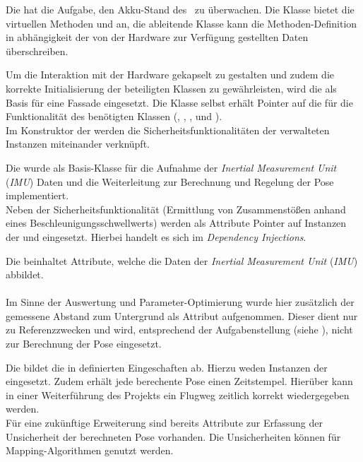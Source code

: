 
Die  hat die Aufgabe, den Akku-Stand des \Quad\ zu überwachen. Die Klasse bietet die virtuellen Methoden  und  an, die ableitende Klasse kann die Methoden-Definition in abhängigkeit der von der Hardware zur Verfügung gestellten Daten überschreiben.


Um die Interaktion mit der Hardware gekapselt zu gestalten und zudem die korrekte Initialisierung der beteiligten Klassen zu gewährleisten, wird die  als Basis für eine Fassade eingesetzt. Die Klasse selbst erhält Pointer auf die für die Funktionalität des \Quad[s] benötigten Klassen (, , ,  und ).\\
Im Konstruktor der  werden die Sicherheitsfunktionalitäten der verwalteten Instanzen miteinander verknüpft.


Die  wurde als Basis-Klasse für die Aufnahme der \textit{Inertial Measurement Unit} (\textit{IMU}) Daten und die Weiterleitung zur Berechnung und Regelung der Pose implementiert.\\
Neben der Sicherheitsfunktionalität (Ermittlung von Zusammenstößen anhand eines Beschleunigungsschwellwerts) werden als Attribute Pointer auf Instanzen der   und  eingesetzt. Hierbei handelt es sich im \textit{Dependency Injections}.


Die  beinhaltet Attribute, welche die Daten der \textit{Inertial Measurement Unit} (\textit{IMU}) abbildet.\\
\\
Im Sinne der Auswertung und Parameter-Optimierung wurde hier zusätzlich der gemessene Abstand zum Untergrund als Attribut aufgenommen. Dieser dient nur zu Referenzzwecken und wird, entsprechend der Aufgabenstellung (siehe ), nicht zur Berechnung der Pose eingesetzt.


Die  bildet die in  definierten Eingeschaften ab. Hierzu weden Instanzen der  eingesetzt. Zudem erhält jede berechente Pose einen Zeitstempel. Hierüber kann in einer Weiterführung des Projekts ein Flugweg zeitlich korrekt wiedergegeben werden.\\
Für eine zukünftige Erweiterung sind bereits Attribute zur Erfassung der Unsicherheit der berechneten Pose vorhanden. Die Unsicherheiten können für Mapping-Algorithmen genutzt werden.


